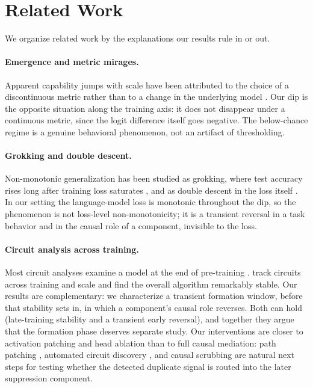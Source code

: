 \documentclass[11pt]{article}
\begin{document}
\section{Related Work}
We organize related work by the explanations our results rule in or out.

\paragraph{Emergence and metric mirages.}
Apparent capability jumps with scale have been attributed to the choice of a
discontinuous metric rather than to a change in the underlying model
\citep{wei2022emergent,schaeffer2023mirage}. Our dip is the opposite situation
along the training axis: it does not disappear under a continuous metric, since
the logit difference itself goes negative. The below-chance regime is a genuine
behavioral phenomenon, not an artifact of thresholding.

\paragraph{Grokking and double descent.}
Non-monotonic generalization has been studied as grokking, where test accuracy
rises long after training loss saturates \citep{power2022grokking,
nanda2023progress}, and as double descent in the loss itself
\citep{nakkiran2021double}. In our setting the language-model loss is monotonic
throughout the dip, so the phenomenon is not loss-level non-monotonicity; it is a
transient reversal in a task behavior and in the causal role of a component,
invisible to the loss.

\paragraph{Circuit analysis across training.}
Most circuit analyses examine a model at the end of pre-training
\citep{wang2023ioi,hanna2023greater}. \citet{tigges2024circuits} track circuits
across training and scale and find the overall algorithm remarkably stable. Our
results are complementary: we characterize a transient formation window, before
that stability sets in, in which a component's causal role reverses. Both can
hold (late-training stability and a transient early reversal), and together they
argue that the formation phase deserves separate study. Our interventions are
closer to activation patching and head ablation than to full causal mediation:
path patching \citep{wang2023ioi}, automated circuit discovery
\citep{conmy2023automated}, and causal scrubbing are natural next steps for
testing whether the detected duplicate signal is routed into the later
suppression component.
\end{document}
